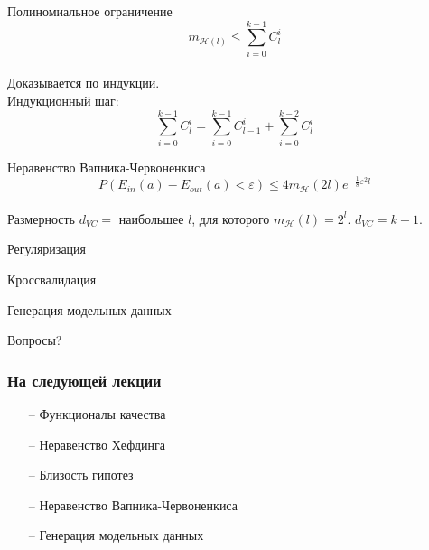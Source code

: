 \documentclass[10pt]{beamer}
\begin{document}
\begin{frame}{Полиномиальное ограничение}  
  $$m_{\mathcal{H}(l)} \leq \sum\limits_{i=0}^{k-1} C_l^i$$\\
  Доказывается по индукции.\\
  Индукционный шаг:
  $$\sum\limits_{i=0}^{k-1} C_l^i = \sum\limits_{i=0}^{k-1} C_{l-1}^i + \sum\limits_{i=0}^{k-2} C_l^i$$
\end{frame}

\begin{frame}{Неравенство Вапника-Червоненкиса}  
  $$P(E_{in}(a) - E_{out}(a) < \varepsilon) \leq 4 m_{\mathcal{H}}(2l) e^{-\frac{1}{8}\varepsilon^2l}$$\\
  \bigbreak
  Размерность $d_{VC} = $ наибольшее $l$, для которого $m_{\mathcal{H}}(l) = 2^l$. $d_{VC} = k-1$.
  
\end{frame}

\begin{frame}{Регуляризация}  

\end{frame}

\begin{frame}{Кроссвалидация}  

\end{frame}

\begin{frame}{Генерация модельных данных}  

\end{frame}

\begin{frame}[standout]
  Вопросы?
\end{frame}

\appendix

\begin{frame}\frametitle{На следующей лекции}
	\begin{itemize}
    	\item[--] Функционалы качества
    	\item[--] Неравенство Хефдинга
    	\item[--] Близость гипотез
    	\item[--] Неравенство Вапника-Червоненкиса
    	\item[--] Генерация модельных данных    	    	
	\end{itemize}
\end{frame}
\end{document}
